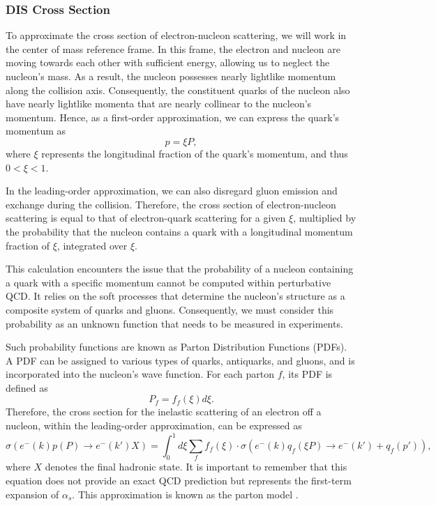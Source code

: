 \subsubsection{DIS Cross Section}
\label{sssec::dis_cross_section}
    To approximate the cross section of electron-nucleon scattering, we will work in the center of mass reference frame.
    In this frame, the electron and nucleon are moving towards each other with sufficient energy, allowing us to neglect the nucleon's mass.
    As a result, the nucleon possesses nearly lightlike momentum along the collision axis.
    Consequently, the constituent quarks of the nucleon also have nearly lightlike momenta that are nearly collinear to the nucleon's momentum.
    Hence, as a first-order approximation, we can express the quark's momentum as
    \begin{equation*}
        p = \xi P,
    \end{equation*}
    where $\xi$ represents the longitudinal fraction of the quark's momentum, and thus $0 < \xi < 1$.

    In the leading-order approximation, we can also disregard gluon emission and exchange during the collision.
    Therefore, the cross section of electron-nucleon scattering is equal to that of electron-quark scattering for a given $\xi$, multiplied by the probability that the nucleon contains a quark with a longitudinal momentum fraction of $\xi$, integrated over $\xi$.

    This calculation encounters the issue that the probability of a nucleon containing a quark with a specific momentum cannot be computed within perturbative QCD.
    It relies on the soft processes that determine the nucleon's structure as a composite system of quarks and gluons.
    Consequently, we must consider this probability as an unknown function that needs to be measured in experiments.

    Such probability functions are known as Parton Distribution Functions (PDFs).
    A PDF can be assigned to various types of quarks, antiquarks, and gluons, and is incorporated into the nucleon's wave function.
    For each parton $f$, its PDF is defined as
    \begin{equation*}
        P_f = f_f(\xi)d\xi.
    \end{equation*}
    Therefore, the cross section for the inelastic scattering of an electron off a nucleon, within the leading-order approximation, can be expressed as
    \begin{equation*}
        \sigma\left( e^-(k) p(P) \rightarrow e^-(k') X \right) =
                \int_0^1d\xi \sum_f f_f(\xi) \cdot
                \sigma\left( e^-(k) q_f(\xi P) \rightarrow e^-(k') + q_f(p') \right),
    \end{equation*}
    where $X$ denotes the final hadronic state.
    It is important to remember that this equation does not provide an exact QCD prediction but represents the first-term expansion of $\alpha_s$.
    This approximation is known as the parton model \cite{halzen1991}.
